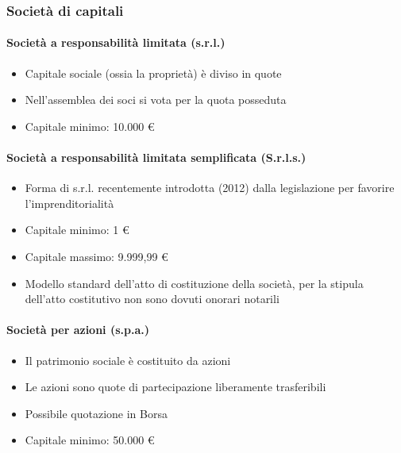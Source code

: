
\subsubsection{Società di capitali}

\paragraph{Società a responsabilità limitata (s.r.l.)}
\begin{itemize}
    \item Capitale sociale (ossia la proprietà) è diviso in quote
    \item Nell’assemblea dei soci si vota per la quota posseduta
    \item Capitale minimo: 10.000 \euro
\end{itemize}

\paragraph{Società a responsabilità limitata semplificata (S.r.l.s.)}
\begin{itemize}
    \item Forma di s.r.l. recentemente introdotta (2012) dalla legislazione per
    favorire l’imprenditorialità
    \item Capitale minimo: 1 \euro
    \item Capitale massimo: 9.999,99 \euro
    \item Modello standard dell’atto di costituzione della società, per la stipula
    dell'atto costitutivo non sono dovuti onorari notarili
\end{itemize}

\paragraph{Società per azioni (s.p.a.)}
\begin{itemize}
    \item Il patrimonio sociale è costituito da azioni
    \item Le azioni sono quote di partecipazione liberamente trasferibili
    \item Possibile quotazione in Borsa
    \item Capitale minimo: 50.000 \euro
\end{itemize}

